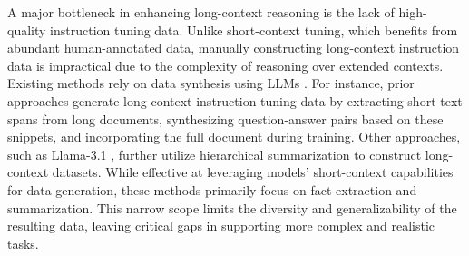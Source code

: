 A major bottleneck in enhancing long-context reasoning is the lack of high-quality instruction tuning data. Unlike short-context tuning, which benefits from abundant human-annotated data, manually constructing long-context instruction data is impractical due to the complexity of reasoning over extended contexts.
Existing methods rely on data synthesis using LLMs \citep{dubey2024llama, an2024make, bai2024longalign, xiong2024effective, xiong2024artificialneedlesrealhaystacks}. 
For instance, prior approaches \citep{xiong2024effective, bai2024longalign} generate long-context instruction-tuning data by extracting short text spans from long documents, synthesizing question-answer pairs based on these snippets, and incorporating the full document during training. Other approaches, such as Llama-3.1 \citep{dubey2024llama}, further utilize hierarchical summarization to construct long-context datasets.
While effective at leveraging models' short-context capabilities for data generation, these methods primarily focus on fact extraction and summarization.
This narrow scope limits the diversity and generalizability of the resulting data, leaving critical gaps in supporting more complex and realistic tasks.

